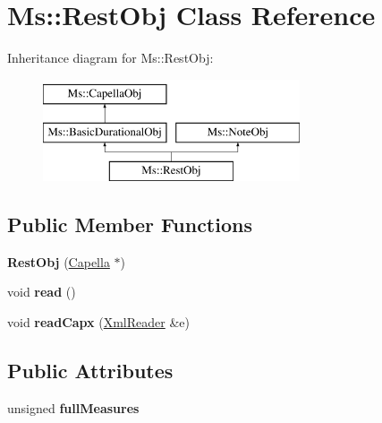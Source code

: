 \hypertarget{class_ms_1_1_rest_obj}{}\section{Ms\+:\+:Rest\+Obj Class Reference}
\label{class_ms_1_1_rest_obj}
Inheritance diagram for Ms\+:\+:Rest\+Obj\+:\begin{figure}[H]
\begin{center}
\leavevmode
\includegraphics[height=3.000000cm]{class_ms_1_1_rest_obj}
\end{center}
\end{figure}
\subsection*{Public Member Functions}
\begin{DoxyCompactItemize}
\item 
\mbox{\label{class_ms_1_1_rest_obj_a5e53699bdb3deb3e732bd5c908bc30e7}} 
{\bfseries Rest\+Obj} (\hyperlink{class_ms_1_1_capella}{Capella} $\ast$)
\item 
\mbox{\label{class_ms_1_1_rest_obj_a416fadbac90221e2662beebe6ea3eea0}} 
void {\bfseries read} ()
\item 
\mbox{\label{class_ms_1_1_rest_obj_a23c5a2cce3c6f854f8ad63b6eed1609c}} 
void {\bfseries read\+Capx} (\hyperlink{class_ms_1_1_xml_reader}{Xml\+Reader} \&e)
\end{DoxyCompactItemize}
\subsection*{Public Attributes}
\begin{DoxyCompactItemize}
\item 
\mbox{\label{class_ms_1_1_rest_obj_ab24a5a2567781bcdc3f6acdc2b53d5ba}} 
unsigned {\bfseries full\+Measures}
\end{DoxyCompactItemize}
